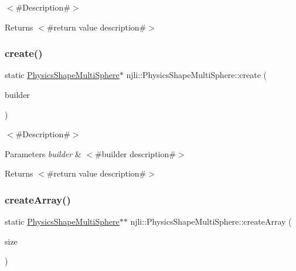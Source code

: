 $<$\#\+Description\#$>$

\begin{DoxyReturn}{Returns}
$<$\#return value description\#$>$ 
\end{DoxyReturn}
\mbox{\label{classnjli_1_1_physics_shape_multi_sphere_af29257cf63678fe9718a821300d5575b}} 
\subsubsection{\texorpdfstring{create()}{create()}\hspace{0.1cm}{\footnotesize\ttfamily [2/2]}}
{\footnotesize\ttfamily static \mbox{\hyperlink{classnjli_1_1_physics_shape_multi_sphere}{Physics\+Shape\+Multi\+Sphere}}$\ast$ njli\+::\+Physics\+Shape\+Multi\+Sphere\+::create (\begin{DoxyParamCaption}\item[{const \mbox{\hyperlink{classnjli_1_1_physics_shape_multi_sphere_builder}{Physics\+Shape\+Multi\+Sphere\+Builder}} \&}]{builder }\end{DoxyParamCaption})\hspace{0.3cm}{\ttfamily [static]}}

$<$\#\+Description\#$>$


\begin{DoxyParams}{Parameters}
{\em builder} & $<$\#builder description\#$>$\\
\hline
\end{DoxyParams}
\begin{DoxyReturn}{Returns}
$<$\#return value description\#$>$ 
\end{DoxyReturn}
\mbox{\label{classnjli_1_1_physics_shape_multi_sphere_a27f19ac79c5e8b7034fcfb4fc05b2388}} 
\subsubsection{\texorpdfstring{create\+Array()}{createArray()}}
{\footnotesize\ttfamily static \mbox{\hyperlink{classnjli_1_1_physics_shape_multi_sphere}{Physics\+Shape\+Multi\+Sphere}}$\ast$$\ast$ njli\+::\+Physics\+Shape\+Multi\+Sphere\+::create\+Array (\begin{DoxyParamCaption}\item[{const \mbox{\hyperlink{_util_8h_a10e94b422ef0c20dcdec20d31a1f5049}{u32}}}]{size }\end{DoxyParamCaption})\hspace{0.3cm}{\ttfamily [static]}}

